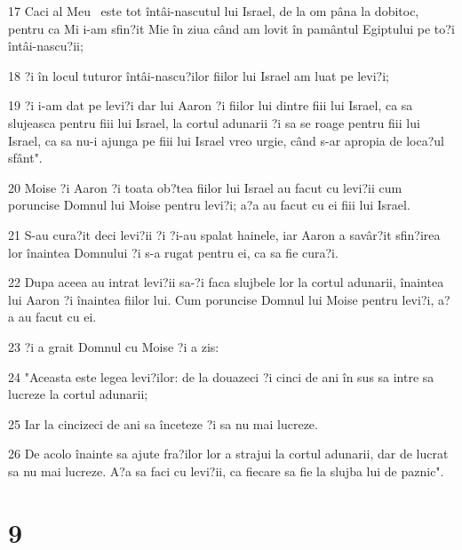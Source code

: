 \par 17 Caci al Meu  este tot întâi-nascutul lui Israel, de la om pâna la dobitoc, pentru ca Mi i-am sfin?it Mie în ziua când am lovit în pamântul Egiptului pe to?i întâi-nascu?ii;
\par 18 ?i în locul tuturor întâi-nascu?ilor fiilor lui Israel am luat pe levi?i;
\par 19 ?i i-am dat pe levi?i dar lui Aaron ?i fiilor lui dintre fiii lui Israel, ca sa slujeasca pentru fiii lui Israel, la cortul adunarii ?i sa se roage pentru fiii lui Israel, ca sa nu-i ajunga pe fiii lui Israel vreo urgie, când s-ar apropia de loca?ul sfânt".
\par 20 Moise ?i Aaron ?i toata ob?tea fiilor lui Israel au facut cu levi?ii cum poruncise Domnul lui Moise pentru levi?i; a?a au facut cu ei fiii lui Israel.
\par 21 S-au cura?it deci levi?ii ?i ?i-au spalat hainele, iar Aaron a savâr?it sfin?irea lor înaintea Domnului ?i s-a rugat pentru ei, ca sa fie cura?i.
\par 22 Dupa aceea au intrat levi?ii sa-?i faca slujbele lor la cortul adunarii, înaintea lui Aaron ?i înaintea fiilor lui. Cum poruncise Domnul lui Moise pentru levi?i, a?a au facut cu ei.
\par 23 ?i a grait Domnul cu Moise ?i a zis:
\par 24 "Aceasta este legea levi?ilor: de la douazeci ?i cinci de ani în sus sa intre sa lucreze la cortul adunarii;
\par 25 Iar la cincizeci de ani sa înceteze ?i sa nu mai lucreze.
\par 26 De acolo înainte sa ajute fra?ilor lor a strajui la cortul adunarii, dar de lucrat sa nu mai lucreze. A?a sa faci cu levi?ii, ca fiecare sa fie la slujba lui de paznic".

\chapter{9}

